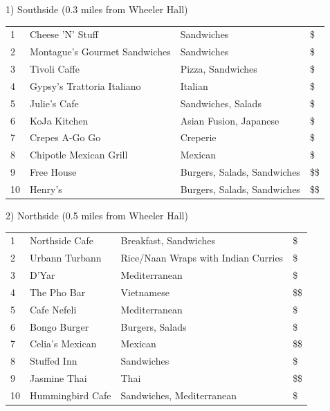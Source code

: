 \vspace{1mm}

1) Southside (0.3 miles from Wheeler Hall)

\begingroup
\small
\begin{multicols}{1}[]
    \begin{tabular}{p{0.3cm} p{4cm} p{5cm} p{0.5cm}}
        1 & Cheese 'N' Stuff & Sandwiches & \$\\
        2 & Montague's Gourmet Sandwiches & Sandwiches & \$\\
        3 & Tivoli Caffe & Pizza, Sandwiches & \$\\
        4 & Gypsy's Trattoria Italiano & Italian  & \$\\
        5 & Julie's Cafe & Sandwiches, Salads & \$\\ 
        6 & KoJa Kitchen & Asian Fusion, Japanese & \$\\
        7 & Crepes A-Go Go & Creperie & \$\\
        8 & Chipotle Mexican Grill & Mexican & \$\\
        9 & Free House & Burgers, Salads, Sandwiches & \$\$\\
        10 & Henry's & Burgers, Salads, Sandwiches & \$\$\\
    \end{tabular}
\end{multicols}
\endgroup
\normalsize 

2) Northside (0.5 miles from Wheeler Hall)

\begingroup
\small
\begin{multicols}{1}[]
    \begin{tabular}{p{0.3cm} p{4cm} p{5cm} p{0.5cm}}
        1 & Northside Cafe & Breakfast, Sandwiches & \$\\
        2 & Urbann Turbann & Rice/Naan Wraps with Indian Curries & \$\\
        3 & D'Yar & Mediterranean & \$\\
        4 & The Pho Bar & Vietnamese  & \$\$\\
        5 & Cafe Nefeli & Mediterranean & \$\\ 
        6 & Bongo Burger & Burgers, Salads & \$\\
        7 & Celia's Mexican & Mexican & \$\$\\
        8 & Stuffed Inn & Sandwiches & \$\\
        9 & Jasmine Thai & Thai & \$\$\\
        10 & Hummingbird Cafe & Sandwiches, Mediterranean & \$\\
    \end{tabular}
\end{multicols}
\endgroup
\normalsize 

